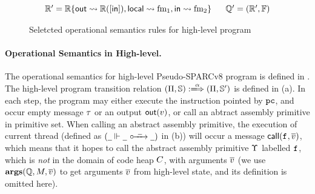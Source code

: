 \begin{figure*}[!t]
{\begin{minipage}[b]{1\textwidth}
\[\begin{array}{c}
{\begin{array}{c}
                        \\ 
                        \hRfile' = \hRfile\{ \outRN \rightsquigarrow 
                            \hRfile([\inRN]), \localRN \rightsquigarrow \fm_1, 
                            \inRN \rightsquigarrow \fm_2 \} \quad \ \ 
                        \hRstate' = (\hRfile', \hWstk)
                    \end{array}
                }
            \end{array}        
        \]
        \vspace{0.2em}
        \end{minipage}
    } 
    \caption{Seletcted operational semantics rules for high-level program}
    \label{fig:selected-opsem-high-level-prog}
\end{figure*}

\paragraph{\textbf{Operational Semantics in High-level.}} 
The operational semantics for high-level Pseudo-SPARCv8 program 
is defined in \Fig{\ref{fig:selected-opsem-high-level-prog}}. 
The high-level program transition relation 
$\HGlobTrans{(\HMd, \hpstate)}{\hmsg}{(\HMd, \hpstate')}$ is defined 
in \Fig{\ref{fig:selected-opsem-high-level-prog}} (a). In each step, 
the program may either execute the instruction pointed by $\texttt{pc}$,  
and occur empty message $\tau$ or an output $\textsf{out}({v})$, 
or call  an abtract assembly primitive in primitive set.
When calling an abstract assembly primitive, 
the execution of current thread (defined as 
$({\underline{\ \,}} \Vdash {\underline{\ \,}} \ \circ\mkern-7mu\xrightarrow{\ \underline{\ \,} \ } {\underline{\ \,}})$ in 
\Fig{\ref{fig:selected-opsem-high-level-prog}} (b)) will occur 
a message $\textsf{call}({\texttt{f}_{}, \overline{v}})$, which means that it 
hopes to call the abstract assembly primitive $\Upsilon$ labelled 
$\texttt{f}_{}$, which is {\it not} in the domain of code heap $C$, 
with arguments $\overline{v}$ 
(we use $\textbf{args}(\mathbb{Q}, M, \overline{v})$ 
to get arguments $\overline{v}$ 
from high-level state, and its definition is omitted here). 

